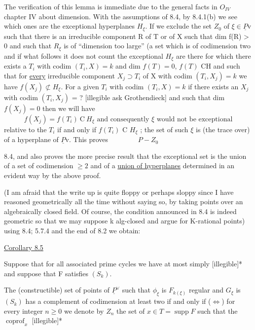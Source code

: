 \documentclass[11pt]{article}
\newcommand{\scanpage}[1]{\par\bigskip\noindent{\small\sffamily[scan #1]}\par}
\newcommand{\mspage}[1]{{\small\sffamily[p.\,#1]}}
\newcommand{\uline}[1]{\underline{#1}}
\begin{document}
The verification of this lemma is immediate due to the general
facts in $O_{IV}$ chapter IV about dimension.  With the assumptions of
8.4, by 8.4.1(b) we see which ones are the exceptional hyperplanes
$H_\xi$.  If we exclude the set $Z_0$ of $\xi \in \underline{P}\mathrm{v}$ such that there is an
irreducible component R of T or of X such that dim f(R) > 0 and
such that $R_\xi$ is of ``dimension too large'' (a set which is of
codimension two and if what follows it does not count the
exceptional $H_\xi$ are there for which there exists a $T_i$ with codim
$(T_i, X) = k$ and dim $f(T) = 0$, $f(T)$ CH and such that for \uline{every}
irreducible component $X_j \supset T_i$ of X with codim $(T_i, X_j) = k$ we have
$f(X_j) \not\subset H_\xi$.  For a given $T_i$ with codim $(T_i, X) = k$ if there exists
an $X_j$ with codim $(T_i, X_j)$ = ? [illegible ask Grothendieck]
and such that dim $f(X_j) = 0$ then we will have
\[ f(X_j) = f(T_i)\ \mathrm{C}\ H_\xi \text{ and consequently } \xi \text{ would not be exceptional} \]
relative to the $T_i$ if and only if $f(T_i)$ C $H_\xi$ ; the set of such $\xi$ is
(the trace over) of a hyperplane of $\underline{P}\mathrm{v}$.  This proves
$\qquad\qquad P - Z_0$

8.4, and also proves the more precise result that the exceptional
set is the union of a set of codimension $\geq 2$ and of a \uline{union of
hyperplanes} determined in an evident way by the above proof.

\clearpage
\scanpage{24/41}
\mspage{41}

(I am afraid that the write up is quite floppy or perhaps
sloppy since I have reasoned geometrically all the time without
saying so, by taking points over an algebraically closed field.
Of course, the condition announced in 8.4 is indeed geometric so
that we may suppose k alg-closed and argue for K-rational points)
using 8.4; 5.7.4 and the end of 8.2 we obtain:

\uline{Corollary 8.5}

Suppose that for all associated prime cycles we have at most
simply [illegible]* and suppose that F satisfies $(S_k)$.

The (constructible) set of points of $\underline{P}^{\vee}$ such that $\phi_\xi$ is $F_{k(\xi)}$
regular and $G_\xi$ is $(S_k)$ has a complement of codimension at least two
if and only if ($\Leftrightarrow$) for every integer $n \geq 0$ we denote by $Z_n$ the set
of $x \in T = \operatorname{supp} F$ such that the $\operatorname{coprof}_x$ [illegible]*
\end{document}
